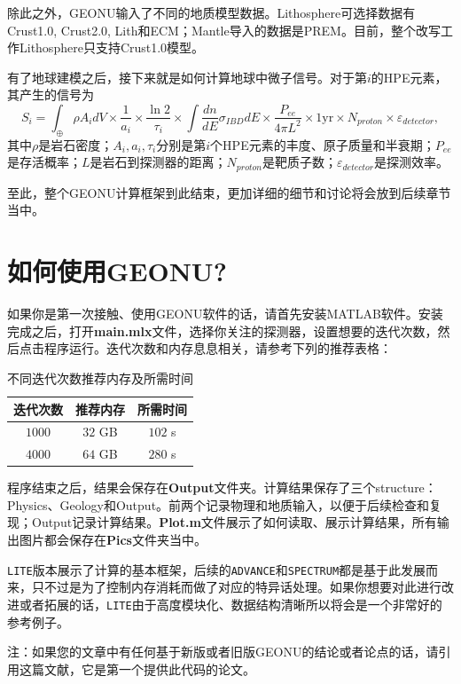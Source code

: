 			除此之外，GEONU输入了不同的地质模型数据。Lithosphere可选择数据有Crust1.0, Crust2.0, Lith和ECM；Mantle导入的数据是PREM。目前，整个改写工作Lithosphere只支持Crust1.0模型。\par
			有了地球建模之后，接下来就是如何计算地球中微子信号。对于第$i$的HPE元素，其产生的信号为
				\begin{equation}
					S_i
					= \int_{\oplus} \rho A_i dV \times \frac{1}{a_i} \times \frac{\ln 2}{\tau_i}\times \int \frac{dn}{dE} \sigma_{IBD} dE \times \frac{P_{ee}}{4\pi L^2} \times 1 \text{yr} \times N_{proton} \times \varepsilon_{detector},
				\end{equation}
			其中$\rho$是岩石密度；$A_i, a_i, \tau_i$分别是第$i$个HPE元素的丰度、原子质量和半衰期；$P_{ee}$是存活概率；$L$是岩石到探测器的距离；$N_{proton}$是靶质子数；$\varepsilon_{detector}$是探测效率。\par
			至此，整个GEONU计算框架到此结束，更加详细的细节和讨论将会放到后续章节当中。
		\section{如何使用GEONU?}
			如果你是第一次接触、使用GEONU软件的话，请首先安装MATLAB软件。安装完成之后，打开\textbf{main.mlx}文件，选择你关注的探测器，设置想要的迭代次数，然后点击程序运行。迭代次数和内存息息相关，请参考下列的推荐表格：
				\begin{table}[H]
					\centering
					\caption{不同迭代次数推荐内存及所需时间}
					\begin{tabular}{|c|c|c|}
						\hline
						迭代次数 & 推荐内存 & 所需时间\\
						\hline
						$1000$ & $32$ GB & $102$ s\\
						\hline
						$4000$ & $64$ GB & $280$ s\\
						\hline
					\end{tabular}
				\end{table}
			程序结束之后，结果会保存在\textbf{Output}文件夹。计算结果保存了三个structure：Physics、Geology和Output。前两个记录物理和地质输入，以便于后续检查和复现；Output记录计算结果。\textbf{Plot.m}文件展示了如何读取、展示计算结果，所有输出图片都会保存在\textbf{Pics}文件夹当中。\par
			\texttt{LITE}版本展示了计算的基本框架，后续的\texttt{ADVANCE}和\texttt{SPECTRUM}都是基于此发展而来，只不过是为了控制内存消耗而做了对应的特异话处理。如果你想要对此进行改进或者拓展的话，\texttt{LITE}由于高度模块化、数据结构清晰所以将会是一个非常好的参考例子。\par
			{\color{red} 注：如果您的文章中有任何基于新版或者旧版GEONU的结论或者论点的话，请引用这篇文献\cite{wipperfurth2020reference}，它是第一个提供此代码的论文。}
